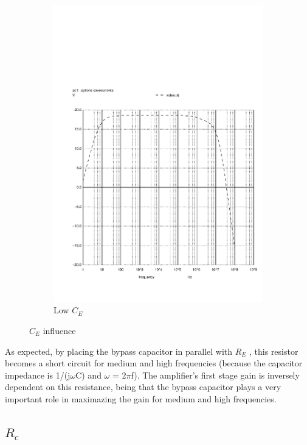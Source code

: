 \begin{figure}[H]
\begin{subfigure}{0.3\textwidth}
\includegraphics[width=\textwidth]{c2low.pdf}
\caption{Low $C_E$}
\label{lowce}
\end{subfigure}
\caption{$C_E$ influence}
\end{figure}

As expected, by placing the bypass capacitor in parallel with $R_E$ , this resistor becomes a short circuit for medium and high frequencies (because the capacitor impedance is 1/(j$\omega$C) and $\omega$ = 2$\pi$f). The amplifier’s first stage gain is inversely dependent on this resistance, being that the bypass capacitor plays a very important role in maximazing the gain for medium and high frequencies.

\subsection{$R_c$}

